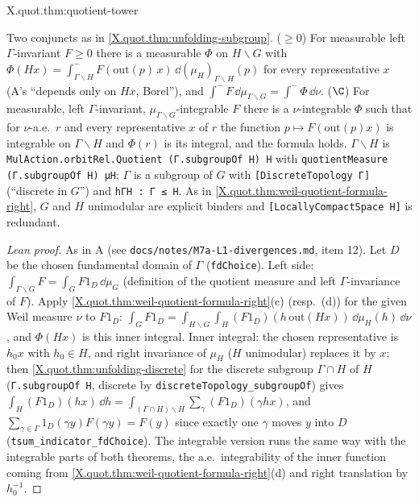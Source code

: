 \begin{tfformal}{X.quot.thm:quotient-tower}
\begin{tffidelity}
Two conjuncts as in \cref{X.quot.thm:unfolding-subgroup}. ($\ge0$) For measurable left $\Gamma$-invariant $F\ge0$ there is a measurable $\Phi$ on $H\backslash G$ with $\Phi(Hx)=\int^-_{\Gamma\backslash H}F(\mathrm{out}(p)\,x)\,\dd(\mu_H)_{\Gamma\backslash H}(p)$ for every representative $x$ (A's ``depends only on $Hx$, Borel''), and $\int^-F\,\dd\mu_{\Gamma\backslash G}=\int^-\Phi\,\dd\nu$. ($\C$) For measurable, left $\Gamma$-invariant, $\mu_{\Gamma\backslash G}$-integrable $F$ there is a $\nu$-integrable $\Phi$ such that for $\nu$-a.e.\ $r$ and every representative $x$ of $r$ the function $p\mapsto F(\mathrm{out}(p)x)$ is integrable on $\Gamma\backslash H$ and $\Phi(r)$ is its integral, and the formula holds. $\Gamma\backslash H$ is \texttt{MulAction.orbitRel.Quotient (Γ.subgroupOf H) H} with \texttt{quotientMeasure (Γ.subgroupOf H) μH}; $\Gamma$ is a subgroup of $G$ with \texttt{[DiscreteTopology Γ]} (``discrete in $G$'') and \texttt{hΓH : Γ ≤ H}. As in \cref{X.quot.thm:weil-quotient-formula-right}, $G$ and $H$ unimodular are explicit binders and \texttt{[LocallyCompactSpace H]} is redundant.
\end{tffidelity}
\end{tfformal}
\begin{proof}[Lean proof]
As in A (see \texttt{docs/notes/M7a-L1-divergences.md}, item 12). Let $D$ be the chosen fundamental domain of $\Gamma$ (\texttt{fdChoice}). Left side: $\int_{\Gamma\backslash G}F=\int_GF1_D\,\dd\mu_G$ (definition of the quotient measure and left $\Gamma$-invariance of $F$). Apply \cref{X.quot.thm:weil-quotient-formula-right}(c) (resp.\ (d)) for the given Weil measure $\nu$ to $F1_D$: $\int_GF1_D=\int_{H\backslash G}\int_H(F1_D)(h\,\mathrm{out}(Hx))\,\dd\mu_H(h)\,\dd\nu$, and $\Phi(Hx)$ is this inner integral. Inner integral: the chosen representative is $h_0x$ with $h_0\in H$, and right invariance of $\mu_H$ ($H$ unimodular) replaces it by $x$; then \cref{X.quot.thm:unfolding-discrete} for the discrete subgroup $\Gamma\cap H$ of $H$ (\texttt{Γ.subgroupOf H}, discrete by \texttt{discreteTopology\_subgroupOf}) gives $\int_H(F1_D)(hx)\,\dd h=\int_{(\Gamma\cap H)\backslash H}\sum_{\gamma}(F1_D)(\gamma hx)$, and $\sum_{\gamma\in\Gamma}1_D(\gamma y)F(\gamma y)=F(y)$ since exactly one $\gamma$ moves $y$ into $D$ (\texttt{tsum\_indicator\_fdChoice}). The integrable version runs the same way with the integrable parts of both theorems, the a.e.\ integrability of the inner function coming from \cref{X.quot.thm:weil-quotient-formula-right}(d) and right translation by $h_0^{-1}$.
\end{proof}

